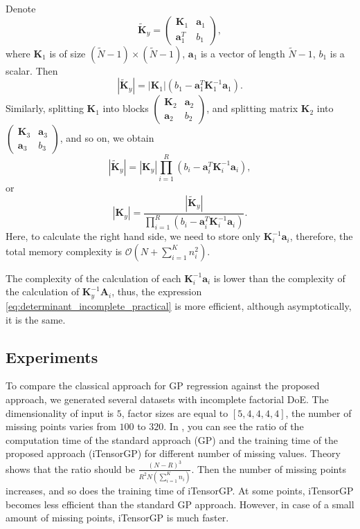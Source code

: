 Denote
\[
\mathbf{\widetilde{K}}_y = \begin{pmatrix}
  \mathbf{K}_1 & \mathbf{a}_1 \\
  \mathbf{a}_1^T & b_1
\end{pmatrix},
\]
where $\mathbf{K}_1$ is of size $(\widetilde{N} - 1) \times (\widetilde{N} - 1)$,
$\mathbf{a}_1$ is a vector of length $\widetilde{N} - 1$, $b_1$ is a scalar.
Then
\[
|\mathbf{\widetilde{K}}_y| = |\mathbf{K}_1| (b_1 - \mathbf{a}_1^T \mathbf{K}_1^{-1}\mathbf{a}_1).
\]
Similarly, splitting $\mathbf{K}_1$ into blocks
$\begin{pmatrix}
\mathbf{K}_2 & \mathbf{a}_2 \\
\mathbf{a}_2 & b_2
\end{pmatrix}$,
and splitting matrix $\mathbf{K}_2$ into
$\begin{pmatrix}
\mathbf{K}_3 & \mathbf{a}_3 \\
\mathbf{a}_3 & b_3
\end{pmatrix}$,
and so on, we obtain
\[
|\mathbf{\widetilde{K}}_y| =
|\mathbf{K}_y| \prod_{i = 1}^R(b_i - \mathbf{a}_i^T\mathbf{K}_i^{-1}\mathbf{a}_i),
\]
or
\begin{equation}
\label{eq:determinant_incomplete_practical}
|\mathbf{K}_y| =
\frac{|\mathbf{\widetilde{K}}_y|}{\prod_{i = 1}^R(b_i -
\mathbf{a}_i^T\mathbf{K}_i^{-1} \mathbf{a}_i)}.
\end{equation}
Here, to calculate the right hand side, we need to store only $\mathbf{K}_i^{-1}\mathbf{a}_i$,
therefore, the total memory complexity is $\mathcal{O}(N + \sum_{i = 1}^K n_i^2)$.

The complexity of the calculation of each $\mathbf{K}_i^{-1}\mathbf{a}_i$ is lower
than the complexity of the calculation of $\mathbf{K}_y^{-1}\mathbf{A}_i$,
thus, the expression \eqref{eq:determinant_incomplete_practical} is more efficient,
although asymptotically, it is the same.


\subsection{Experiments}
To compare the classical approach for GP regression against the proposed approach,
we generated several datasets with incomplete factorial DoE.
The dimensionality of input is $5$, factor sizes are equal to $[5, 4, 4, 4, 4]$, the number of missing points varies from $100$ to $320$.
In , you can see the ratio of the computation time of the standard approach (GP)
and the training time of the proposed approach (iTensorGP) for different number of missing
values.
Theory shows that the ratio should be $\frac{(N - R)^3}{R^2 N(\sum_{i = 1}^K n_i)}$.
Then the number of missing points increases, and so does the training time of iTensorGP.
At some points, iTensorGP becomes less efficient than the standard GP approach.
However, in case of a small amount of missing points, iTensorGP is much faster.

